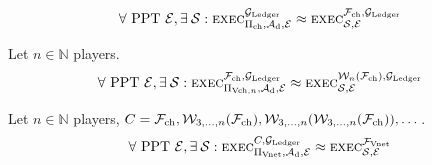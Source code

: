 \begin{theorem}
  \label{theorem:channel:basic}
  \begin{equation*}
    \forall \text{ PPT } \mathcal{E}, \exists \: \mathcal{S}:
    \textsc{exec}^{\mathcal{G}_{\mathrm{Ledger}}}_{\Pi_{\mathrm{ch}}, \mathcal{A}_{\mathrm{d}}, \mathcal{E}}
    \approx \textsc{exec}^{\mathcal{F}_{\mathrm{ch}}, \mathcal{G}_{\mathrm{Ledger}}}_{\mathcal{S}, \mathcal{E}}
  \end{equation*}
\end{theorem}

\begin{theorem}
  \label{theorem:channel:virtual}
  Let $n \in \mathbb{N}$ players.
  \begin{equation*}
    \forall \text{ PPT } \mathcal{E}, \exists \: \mathcal{S}:
    \textsc{exec}^{\mathcal{F}_{\mathrm{ch}}, \mathcal{G}_{\mathrm{Ledger}}}_{\Pi_{\mathrm{Vch}, n}, \mathcal{A}_{\mathrm{d}},
    \mathcal{E}} \approx \textsc{exec}^{\mathcal{W}_{n}(\mathcal{F}_{\mathrm{ch}}), \mathcal{G}_{\mathrm{Ledger}}}_{\mathcal{S},
    \mathcal{E}}
  \end{equation*}
\end{theorem}

\begin{theorem}
  \label{theorem:paynet}
  Let $n \in \mathbb{N}$ players, $C = \mathcal{F}_{\mathrm{ch}}, \mathcal{W}_{3, \dots, n}(\mathcal{F}_{\mathrm{ch}}),
  \mathcal{W}_{3, \dots, n}(\mathcal{W}_{3, \dots, n}(\mathcal{F}_{\mathrm{ch}})), \dots$. 
  \begin{equation*}
    \forall \text{ PPT } \mathcal{E}, \exists \: \mathcal{S}:
    \textsc{exec}^{C, \mathcal{G}_{\mathrm{Ledger}}}_{\Pi_{\mathrm{Vnet}}, \mathcal{A}_{\mathrm{d}},
    \mathcal{E}} \approx \textsc{exec}^{\mathcal{F}_{\mathrm{Vnet}}}_{\mathcal{S}, \mathcal{E}}
  \end{equation*}
\end{theorem}
